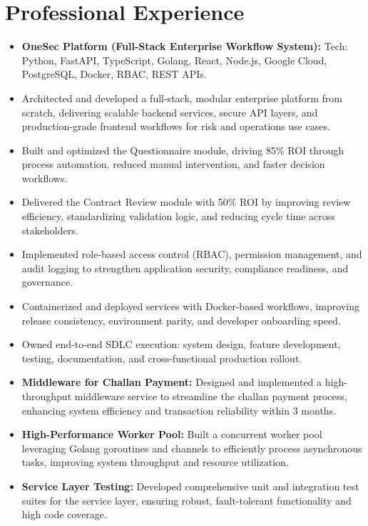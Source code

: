 \section{Professional Experience}

\begin{itemize}
  \item \textbf{OneSec Platform (Full-Stack Enterprise Workflow System):} Tech: Python, FastAPI, TypeScript, Golang, React, Node.js, Google Cloud, PostgreSQL, Docker, RBAC, REST APIs.
  \item Architected and developed a full-stack, modular enterprise platform from scratch, delivering scalable backend services, secure API layers, and production-grade frontend workflows for risk and operations use cases.
  \item Built and optimized the Questionnaire module, driving 85\% ROI through process automation, reduced manual intervention, and faster decision workflows.
  \item Delivered the Contract Review module with 50\% ROI by improving review efficiency, standardizing validation logic, and reducing cycle time across stakeholders.
  \item Implemented role-based access control (RBAC), permission management, and audit logging to strengthen application security, compliance readiness, and governance.
  \item Containerized and deployed services with Docker-based workflows, improving release consistency, environment parity, and developer onboarding speed.
  \item Owned end-to-end SDLC execution: system design, feature development, testing, documentation, and cross-functional production rollout.
\end{itemize}

\begin{itemize}
  \item \textbf{Middleware for Challan Payment:} Designed and implemented a high-throughput middleware service to streamline the challan payment process, enhancing system efficiency and transaction reliability within 3 months.
  \item \textbf{High-Performance Worker Pool:} Built a concurrent worker pool leveraging Golang goroutines and channels to efficiently process asynchronous tasks, improving system throughput and resource utilization.
  \item \textbf{Service Layer Testing:} Developed comprehensive unit and integration test suites for the service layer, ensuring robust, fault-tolerant functionality and high code coverage.
\end{itemize}

